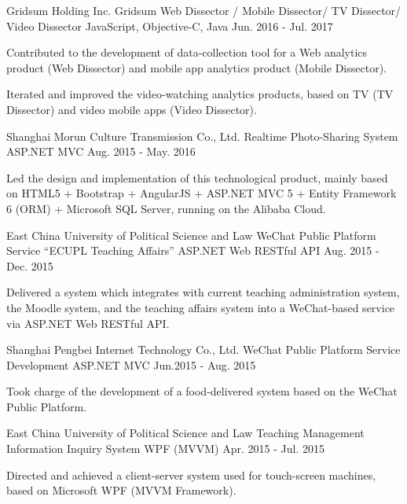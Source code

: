 \begin{cventries}
  \cventry
    {Gridsum Holding Inc.}
    {Gridsum Web Dissector / Mobile Dissector/ TV Dissector/ Video Dissector}
    {JavaScript, Objective-C, Java}
    {Jun. 2016 - Jul. 2017}
    {
      \begin{cvitems}
        \item {Contributed to the development of data-collection tool for a Web analytics product (Web Dissector) and mobile app analytics product (Mobile Dissector).}
        \item {Iterated and improved the video-watching analytics products, based on TV (TV Dissector) and video mobile apps (Video Dissector).}
      \end{cvitems}
    }
    
  \cventry
    {Shanghai Morun Culture Transmission Co., Ltd.}
    {Realtime Photo-Sharing System}
    {ASP.NET MVC}
    {Aug. 2015 - May. 2016}
    {
      \begin{cvitems}
        \item {Led the design and implementation of this technological product, mainly based on HTML5 + Bootstrap + AngularJS + ASP.NET MVC 5 + Entity Framework 6 (ORM) + Microsoft SQL Server, running on the Alibaba Cloud.}
      \end{cvitems}
    }
    
  \cventry
    {East China University of Political Science and Law}
    {WeChat Public Platform Service “ECUPL Teaching Affairs”}
    {ASP.NET Web RESTful API}
    {Aug. 2015 - Dec. 2015}
    {
      \begin{cvitems}
        \item {Delivered a system which integrates with current teaching administration system, the Moodle system, and the teaching affairs system into a WeChat-based service via ASP.NET Web RESTful API.}
      \end{cvitems}
    }
    
  \cventry
    {Shanghai Pengbei Internet Technology Co., Ltd.}
    {WeChat Public Platform Service Development}
    {ASP.NET MVC}
    {Jun.2015 - Aug. 2015}
    {
      \begin{cvitems}
        \item {Took charge of the development of a food-delivered system based on the WeChat Public Platform.}
      \end{cvitems}
    }
    
  \cventry
    {East China University of Political Science and Law}
    {Teaching Management Information Inquiry System}
    {WPF (MVVM)}
    {Apr. 2015 - Jul. 2015}
    {
      \begin{cvitems}
        \item {Directed and achieved a client-server system used for touch-screen machines, based on Microsoft WPF (MVVM Framework).}
      \end{cvitems}
    }
    

\end{cventries}
